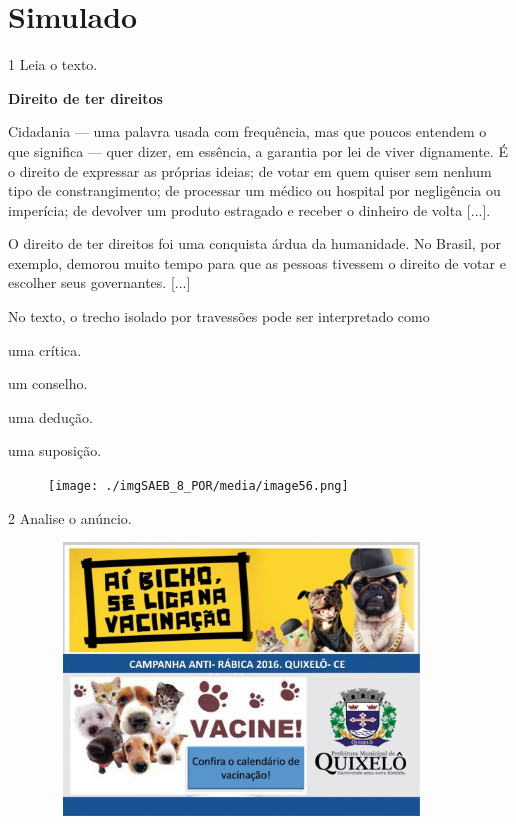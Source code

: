 
\setcounter{chapter}{0}
\chapter[Simulado 1]{Simulado}

\num{1} Leia o texto.

\begin{myquote}
\centering\textbf{Direito de ter direitos}

Cidadania --- uma palavra usada com frequência, mas que poucos entendem o
que significa --- quer dizer, em essência, a garantia por lei de viver
dignamente. É o direito de expressar as próprias ideias; de votar em
quem quiser sem nenhum tipo de constrangimento; de processar um médico
ou hospital por negligência ou imperícia; de devolver um produto
estragado e receber o dinheiro de volta {[}...{]}.

O direito de ter direitos foi uma conquista árdua da humanidade. No
Brasil, por exemplo, demorou muito tempo para que as pessoas tivessem o
direito de votar e escolher seus governantes. {[}...{]}

\end{myquote}

No texto, o trecho isolado por travessões pode ser interpretado como

\begin{escolha}
\item uma crítica.

\item um conselho.

\item uma dedução.

\item uma suposição.
\end{escolha}

\begin{figure}[H]
\centering
\texttt{[image: ./imgSAEB\_8\_POR/media/image56.png]}
\end{figure}

\num{2} Analise o anúncio.

\begin{figure}[H]
\centering
\includegraphics[width=4.03125in,height=2.85231in]{./imgSAEB_8_POR/media/image28.png}
\end{figure}

